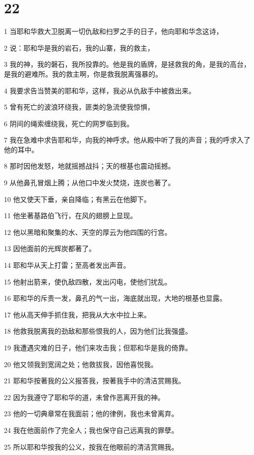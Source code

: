 \chapter{22}

\par 1 当耶和华救大卫脱离一切仇敌和扫罗之手的日子，他向耶和华念这诗，
\par 2 说：耶和华是我的岩石，我的山寨，我的救主，
\par 3 我的神，我的磐石，我所投靠的。他是我的盾牌，是拯救我的角，是我的高台，是我的避难所。我的救主啊，你是救我脱离强暴的。
\par 4 我要求告当赞美的耶和华，这样，我必从仇敌手中被救出来。
\par 5 曾有死亡的波浪环绕我，匪类的急流使我惊惧，
\par 6 阴间的绳索缠绕我，死亡的网罗临到我。
\par 7 我在急难中求告耶和华，向我的神呼求。他从殿中听了我的声音；我的呼求入了他的耳中。
\par 8 那时因他发怒，地就摇撼战抖；天的根基也震动摇撼。
\par 9 从他鼻孔冒烟上腾；从他口中发火焚烧，连炭也著了。
\par 10 他又使天下垂，亲自降临；有黑云在他脚下。
\par 11 他坐著基路伯飞行，在风的翅膀上显现。
\par 12 他以黑暗和聚集的水、天空的厚云为他四围的行宫。
\par 13 因他面前的光辉炭都著了。
\par 14 耶和华从天上打雷；至高者发出声音。
\par 15 他射出箭来，使仇敌四散，发出闪电，使他们扰乱。
\par 16 耶和华的斥责一发，鼻孔的气一出，海底就出现，大地的根基也显露。
\par 17 他从高天伸手抓住我，把我从大水中拉上来。
\par 18 他救我脱离我的劲敌和那些恨我的人，因为他们比我强盛。
\par 19 我遭遇灾难的日子，他们来攻击我；但耶和华是我的倚靠。
\par 20 他又领我到宽阔之处；他救拔我，因他喜悦我。
\par 21 耶和华按著我的公义报答我，按著我手中的清洁赏赐我。
\par 22 因为我遵守了耶和华的道，未曾作恶离开我的神。
\par 23 他的一切典章常在我面前；他的律例，我也未曾离弃。
\par 24 我在他面前作了完全人；我也保守自己远离我的罪孽。
\par 25 所以耶和华按我的公义，按我在他眼前的清洁赏赐我。
